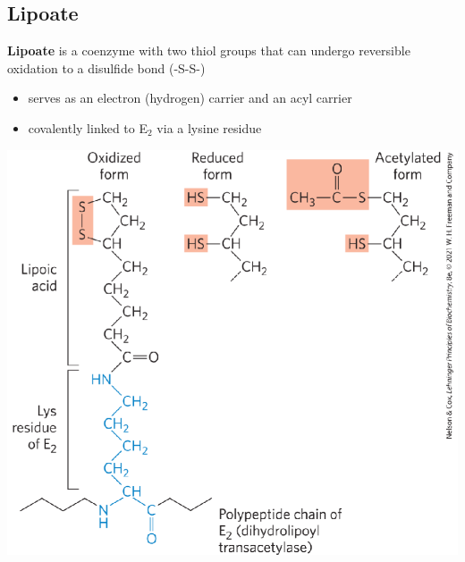 \documentclass[10pt]{article}
\begin{document}
\subsection*{Lipoate}
\textbf{Lipoate} is a coenzyme with two thiol groups that can undergo reversible oxidation to a disulfide bond (-S-S-)
\begin{itemize}
	\item serves as an electron (hydrogen) carrier and an acyl carrier
	\item covalently linked to E$_2$ via a lysine residue
\end{itemize}
\begin{center} 
	\includegraphics*[width=\textwidth]{L3_11.png}
\end{center}
\end{document}
